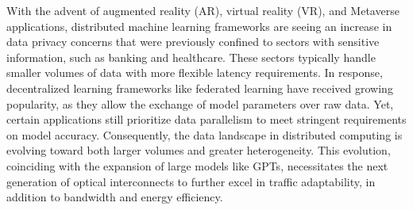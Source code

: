 With the advent of augmented reality (AR), virtual reality (VR), and Metaverse applications, distributed machine learning frameworks are seeing an increase in data privacy concerns that were previously confined to sectors with sensitive information, such as banking and healthcare. These sectors typically handle smaller volumes of data with more flexible latency requirements. In response, decentralized learning frameworks like federated learning have received growing popularity, as they allow the exchange of model parameters over raw data. Yet, certain applications still prioritize data parallelism to meet stringent requirements on model accuracy. Consequently, the data landscape in distributed computing is evolving toward both larger volumes and greater heterogeneity. This evolution, coinciding with the expansion of large models like GPTs, necessitates the next generation of optical interconnects to further excel in traffic adaptability, in addition to bandwidth and energy efficiency.

